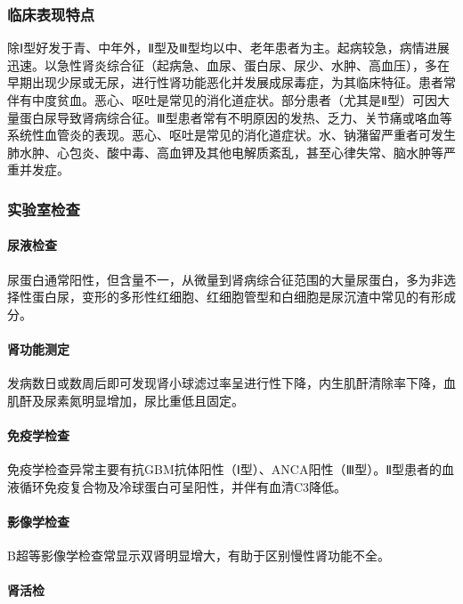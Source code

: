 \subsubsection{临床表现特点}

除Ⅰ型好发于青、中年外，Ⅱ型及Ⅲ型均以中、老年患者为主。起病较急，病情进展迅速。以急性肾炎综合征（起病急、血尿、蛋白尿、尿少、水肿、高血压），多在早期出现少尿或无尿，进行性肾功能恶化并发展成尿毒症，为其临床特征。患者常伴有中度贫血。恶心、呕吐是常见的消化道症状。部分患者（尤其是Ⅱ型）可因大量蛋白尿导致肾病综合征。Ⅲ型患者常有不明原因的发热、乏力、关节痛或咯血等系统性血管炎的表现。恶心、呕吐是常见的消化道症状。水、钠潴留严重者可发生肺水肿、心包炎、酸中毒、高血钾及其他电解质紊乱，甚至心律失常、脑水肿等严重并发症。

\subsubsection{实验室检查}

\paragraph{尿液检查}

尿蛋白通常阳性，但含量不一，从微量到肾病综合征范围的大量尿蛋白，多为非选择性蛋白尿，变形的多形性红细胞、红细胞管型和白细胞是尿沉渣中常见的有形成分。

\paragraph{肾功能测定}

发病数日或数周后即可发现肾小球滤过率呈进行性下降，内生肌酐清除率下降，血肌酐及尿素氮明显增加，尿比重低且固定。

\paragraph{免疫学检查}

免疫学检查异常主要有抗GBM抗体阳性（Ⅰ型）、ANCA阳性（Ⅲ型）。Ⅱ型患者的血液循环免疫复合物及冷球蛋白可呈阳性，并伴有血清C3降低。

\paragraph{影像学检查}

B超等影像学检查常显示双肾明显增大，有助于区别慢性肾功能不全。

\paragraph{肾活检}

